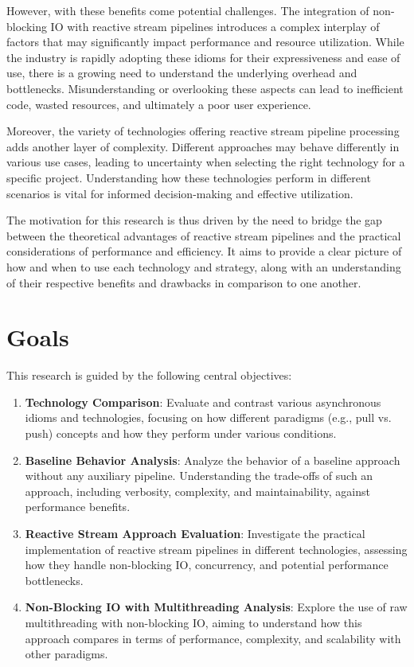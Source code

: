 However, with these benefits come potential challenges. The integration of non-blocking IO with reactive stream pipelines introduces a complex interplay of factors that may significantly impact performance and resource utilization. While the industry is rapidly adopting these idioms for their expressiveness and ease of use, there is a growing need to understand the underlying overhead and bottlenecks. Misunderstanding or overlooking these aspects can lead to inefficient code, wasted resources, and ultimately a poor user experience.

Moreover, the variety of technologies offering reactive stream pipeline processing adds another layer of complexity. Different approaches may behave differently in various use cases, leading to uncertainty when selecting the right technology for a specific project. Understanding how these technologies perform in different scenarios is vital for informed decision-making and effective utilization.

The motivation for this research is thus driven by the need to bridge the gap between the theoretical advantages of reactive stream pipelines and the practical considerations of performance and efficiency. It aims to provide a clear picture of how and when to use each technology and strategy, along with an understanding of their respective benefits and drawbacks in comparison to one another.


\section{Goals}
\label{sec:goals}
This research is guided by the following central objectives:

\begin{enumerate}
\item \textbf{Technology Comparison}: Evaluate and contrast various asynchronous idioms and technologies, focusing on how different paradigms (e.g., pull vs. push) concepts and how they perform under various conditions.

\item \textbf{Baseline Behavior Analysis}: Analyze the behavior of a baseline approach without any auxiliary pipeline. Understanding the trade-offs of such an approach, including verbosity, complexity, and maintainability, against performance benefits.

\item \textbf{Reactive Stream Approach Evaluation}: Investigate the practical implementation of reactive stream pipelines in different technologies, assessing how they handle non-blocking IO, concurrency, and potential performance bottlenecks.

\item \textbf{Non-Blocking IO with Multithreading Analysis}: Explore the use of raw multithreading with non-blocking IO, aiming to understand how this approach compares in terms of performance, complexity, and scalability with other paradigms.

\end{enumerate}

